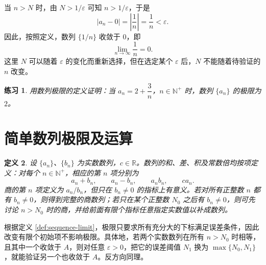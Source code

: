 \documentclass[UTF8,fontset=fandol,11pt]{ctexart}
\newtheorem{definition}{定义}[section]
\newtheorem{exercise}[definition]{练习}
\begin{document}
当 $n>N$ 时，由 $N>1/\varepsilon$ 可知 $n>1/\varepsilon$，于是
\[
\left|a_n-0\right|=\left|\frac{1}{n}\right|=\frac{1}{n}<\varepsilon.
\]
因此，按照定义，数列 $\{1/n\}$ 收敛于 $0$，即
\begin{equation}
\lim_{n\to\infty}\frac{1}{n}=0.
\label{eq:reciprocal-limit}
\end{equation}
这里 $N$ 可以随着 $\varepsilon$ 的变化而重新选择，但在选定某个 $\varepsilon$ 后，$N$ 不能随着待验证的 $n$ 改变。\par
\begin{exercise}
\label{mathagent:exercise:ce65fc79e838caceb1126aaa58de4210a058ca8c1b971fd9686bff7a78892eb8}
用数列极限的定义证明：当 $a_n=2+\dfrac{3}{n}$，$n\in\mathbb{N}^+$ 时，数列 $\{a_n\}$ 的极限为 $2$。
\end{exercise}
\section{简单数列极限及运算}\label{sec:S02}
\begin{definition}
设 $\{a_n\}$、$\{b_n\}$ 为实数数列，$c\in\mathbb{R}$。数列的和、差、积及常数倍均按项定义：对每个 $n\in\mathbb{N}^+$，相应的第 $n$ 项分别为
\[
a_n+b_n,\qquad a_n-b_n,\qquad a_nb_n,\qquad ca_n.
\]
商的第 $n$ 项定义为 $a_n/b_n$，但只在 $b_n\ne0$ 的指标上有意义。若对所有正整数 $n$ 都有 $b_n\ne0$，则得到完整的商数列；若只在某个正整数 $N_0$ 之后有 $b_n\ne0$，则可先讨论 $n>N_0$ 时的商，并给前面有限个指标任意指定实数值以补成数列。
\end{definition}
根据定义 \ref{def:sequence-limit}，极限只要求所有充分大的下标满足误差条件，因此改变有限个初始项不影响极限。具体地，若两个实数数列在所有 $n>N_0$ 时相等，且其中一个收敛于 $A$，则对任意 $\varepsilon>0$，把它的误差阈值 $N_1$ 换为 $\max\{N_0,N_1\}$，就能验证另一个也收敛于 $A$。反方向同理。
\end{document}
